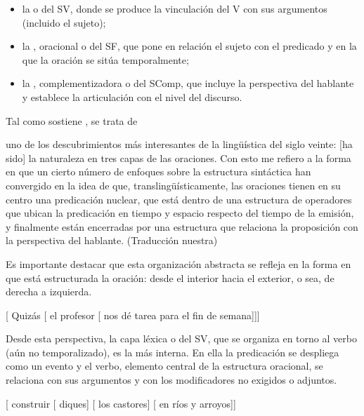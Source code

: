 \begin{itemize}
  \item la  o del SV, donde se produce la vinculación del V
        con sus argumentos (incluido el sujeto);
  \item la , oracional o del SF, que pone en relación el
        sujeto con el predicado y en la que la oración se sitúa temporalmente;
  \item la , complementizadora o del SComp, que
        incluye la perspectiva del hablante y establece la articulación con el
        nivel del discurso.
\end{itemize}

Tal como sostiene \textcite{carnie2008}, se trata de

\begin{cita}
uno de los descubrimientos más interesantes de la lingüística del siglo veinte:
[ha sido] la naturaleza en tres capas de las oraciones. Con esto me refiero a la
forma en que un cierto número de enfoques sobre la estructura sintáctica han
convergido en la idea de que, translingüísticamente, las oraciones tienen en su
centro una predicación nuclear, que está dentro de una estructura de operadores
que ubican la predicación en tiempo y espacio respecto del tiempo de la emisión,
y finalmente están encerradas por una estructura que relaciona la proposición
con la perspectiva del hablante. (Traducción nuestra)
\end{cita}

Es importante destacar que esta organización abstracta se refleja en la forma
en que está estructurada la oración: desde el interior hacia el exterior, o sea,
de derecha a izquierda.

\begin{exe}
  \ex {}[ Quizás [ el profesor [ nos dé tarea para el fin
      de semana]]]
\end{exe}

Desde esta perspectiva, la capa léxica o del SV, que se organiza en torno al
verbo (aún no temporalizado), es la más interna. En ella la predicación se
despliega como un evento y el verbo, elemento central de la estructura
oracional, se relaciona con sus argumentos y con los modificadores no exigidos o
adjuntos.

\begin{exe}
  \ex\label{ex:06-castores} {}[ construir [ diques]
      [ los castores] [ en ríos y arroyos]]
\end{exe}

